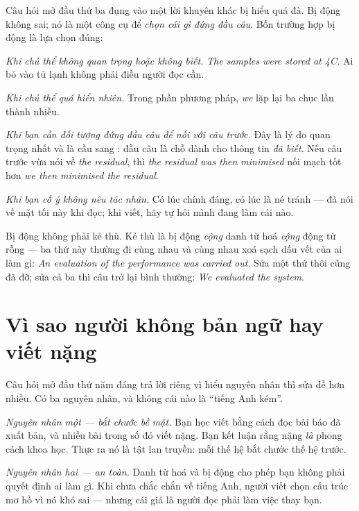 \documentclass[../../english.tex]{subfiles}
\begin{document}
Câu hỏi mở đầu thứ ba đụng vào một lời khuyên khác bị hiểu quá đà. Bị động không sai; nó là một công cụ để \emph{chọn cái gì đứng đầu câu}. Bốn trường hợp bị động là lựa chọn đúng:

\emph{Khi chủ thể không quan trọng hoặc không biết.} \emph{The samples were stored at 4\textdegree C.} Ai bỏ vào tủ lạnh không phải điều người đọc cần.

\emph{Khi chủ thể quá hiển nhiên.} Trong phần phương pháp, \emph{we} lặp lại ba chục lần thành nhiễu.

\emph{Khi bạn cần đối tượng đứng đầu câu để nối với câu trước.} Đây là lý do quan trọng nhất và là cầu sang : đầu câu là chỗ dành cho thông tin \emph{đã biết}. Nếu câu trước vừa nói về \emph{the residual}, thì \emph{the residual was then minimised} nối mạch tốt hơn \emph{we then minimised the residual}.

\emph{Khi bạn cố ý không nêu tác nhân.} Có lúc chính đáng, có lúc là né tránh ---  đã nói về mặt tối này khi đọc; khi viết, hãy tự hỏi mình đang làm cái nào.

\begin{cannho}
Bị động không phải kẻ thù. Kẻ thù là bị động \emph{cộng} danh từ hoá \emph{cộng} động từ rỗng --- ba thứ này thường đi cùng nhau và cùng nhau xoá sạch dấu vết của ai làm gì: \emph{An evaluation of the performance was carried out}. Sửa một thứ thôi cũng đã đỡ; sửa cả ba thì câu trở lại bình thường: \emph{We evaluated the system}.
\end{cannho}

\section{Vì sao người không bản ngữ hay viết nặng}

Câu hỏi mở đầu thứ năm đáng trả lời riêng vì hiểu nguyên nhân thì sửa dễ hơn nhiều. Có ba nguyên nhân, và không cái nào là ``tiếng Anh kém''.

\emph{Nguyên nhân một --- bắt chước bề mặt.} Bạn học viết bằng cách đọc bài báo đã xuất bản, và nhiều bài trong số đó viết nặng. Bạn kết luận rằng nặng \emph{là} phong cách khoa học. Thực ra nó là tật lan truyền: mỗi thế hệ bắt chước thế hệ trước.

\emph{Nguyên nhân hai --- an toàn.} Danh từ hoá và bị động cho phép bạn không phải quyết định ai làm gì. Khi chưa chắc chắn về tiếng Anh, người viết chọn cấu trúc mơ hồ vì nó khó sai --- nhưng cái giá là người đọc phải làm việc thay bạn.
\end{document}
